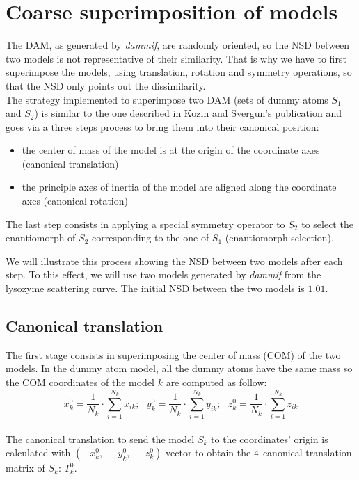 \documentclass[a4paper, 11pt]{report}
\begin{document}
\section{Coarse superimposition of models}

The DAM, as generated by \textit{dammif}, are randomly oriented, so the NSD
between two models is not representative of their similarity.
That is why we have to first superimpose the models, using 
translation, rotation and symmetry operations, so that the NSD only 
points out the dissimilarity.\\

The strategy implemented to superimpose two DAM (sets of
dummy atoms $S_{1}$ and $S_{2}$) is similar to the one described in 
Kozin and Svergun's publication \cite{supcomb} and goes via a three 
steps process to bring them into their canonical position:
\begin{itemize}
  \item the center of mass of the model is at the origin of the 
        coordinate axes (canonical translation)
  \item the principle axes of inertia of the model are aligned along 
        the coordinate axes (canonical rotation)
\end{itemize}
The last step consists in applying a special symmetry operator to 
$S_{2}$ to select the enantiomorph of $S_{2}$ corresponding to the one 
of $S_{1}$ (enantiomorph selection).

We will illustrate this process showing the NSD between two models 
after each step. 
To this effect, we will use two models generated by \textit{dammif} 
from the lysozyme scattering curve. 
The initial NSD between the two models is $1.01$.

\subsection{Canonical translation}

The first stage consists in superimposing the center of mass (COM) of 
the two models. 
In the dummy atom model, all the dummy atoms have the same mass so the 
COM coordinates of the model $k$ are computed as follow:
\[
x_{k}^0 = \frac{1}{N_{k}} \cdot \sum\limits_{i=1}^{N_{k}} x_{ik};\ \ \ 
y_{k}^0 = \frac{1}{N_{k}} \cdot \sum\limits_{i=1}^{N_{k}} y_{ik};\ \ \ 
z_{k}^0 = \frac{1}{N_{k}} \cdot \sum\limits_{i=1}^{N_{k}} z_{ik}
\]\\
The canonical translation to send the model $S_{k}$ to the coordinates' 
origin is calculated with $(-x_{k}^0,\ -y_{k}^0,\ -z_{k}^0)$ vector to 
obtain the $4 \time 4$ canonical translation matrix of $S_{k}$: 
$T_{k}^0$.
\end{document}
